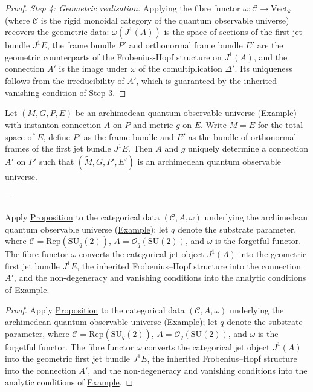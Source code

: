 \begin{proof}
\emph{Step 4: Geometric realisation.}
Applying the fibre functor $\omega\colon \mathcal{C} \to \mathrm{Vect}_k$
(where $\mathcal{C}$ is the rigid monoidal category of the quantum
observable universe)
recovers the geometric data: $\omega(J^1(A))$ is the space of sections of the
first jet bundle $J^1 E$, the frame bundle $P'$ and orthonormal frame bundle
$E'$ are the geometric counterparts of the Frobenius-Hopf structure on
$J^1(A)$, and the connection $A'$ is the image under $\omega$ of the
comultiplication $\Delta'$.  Its uniqueness follows from the irreducibility
of $A'$, which is guaranteed by the inherited vanishing condition of
Step 3.
\end{proof}

\begin{corollary}
  \label{cor:jet-prolongation-C}
Let $(M, G, P, E)$ be an archimedean quantum observable universe
(\hyperref[def:c-quantum-observable-universe]{Example}) with instanton connection
$A$ on $P$ and metric $g$ on $E$.  Write $\widetilde{M} = E$ for the total
space of $E$, define $P'$ as the frame bundle and $E'$ as the bundle of
orthonormal frames of the first jet bundle $J^1 E$.  Then $A$ and $g$
uniquely determine a connection $A'$ on $P'$ such that
$(\widetilde{M}, G, P', E')$ is an archimedean quantum observable universe.

---

Apply \hyperref[prop:jet-prolongation]{Proposition} to the categorical data
$(\mathcal{C}, A, \omega)$ underlying the archimedean quantum
observable universe (\hyperref[def:c-quantum-observable-universe]{Example});
let $q$ denote the substrate parameter,
where $\mathcal{C} = \mathrm{Rep}(\mathrm{SU}_{q}(2))$,
$A = \mathcal{O}_q(\mathrm{SU}(2))$, and $\omega$ is the forgetful
functor.  The fibre functor $\omega$ converts the categorical jet object
$J^1(A)$ into the geometric first jet bundle $J^1 E$, the inherited
Frobenius--Hopf structure into the connection $A'$, and the
non-degeneracy and vanishing conditions into the analytic conditions of
\hyperref[def:c-quantum-observable-universe]{Example}.
\end{corollary}
\begin{proof}
Apply \hyperref[prop:jet-prolongation]{Proposition} to the categorical data
$(\mathcal{C}, A, \omega)$ underlying the archimedean quantum
observable universe (\hyperref[def:c-quantum-observable-universe]{Example});
let $q$ denote the substrate parameter,
where $\mathcal{C} = \mathrm{Rep}(\mathrm{SU}_{q}(2))$,
$A = \mathcal{O}_q(\mathrm{SU}(2))$, and $\omega$ is the forgetful
functor.  The fibre functor $\omega$ converts the categorical jet object
$J^1(A)$ into the geometric first jet bundle $J^1 E$, the inherited
Frobenius--Hopf structure into the connection $A'$, and the
non-degeneracy and vanishing conditions into the analytic conditions of
\hyperref[def:c-quantum-observable-universe]{Example}.
\end{proof}

